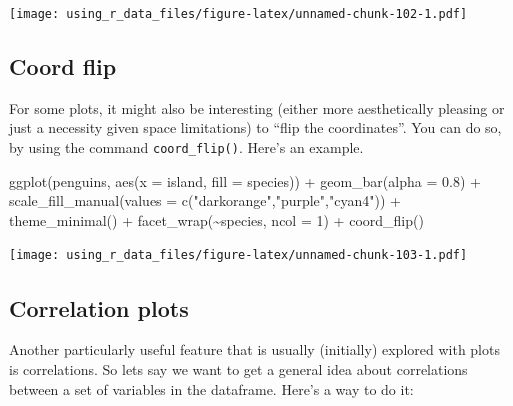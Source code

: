 \documentclass[
]{book}
\newenvironment{Shaded}{\begin{snugshade}}{\end{snugshade}}
\newcommand{\AttributeTok}[1]{\textcolor[rgb]{0.77,0.63,0.00}{#1}}
\newcommand{\DecValTok}[1]{\textcolor[rgb]{0.00,0.00,0.81}{#1}}
\newcommand{\FloatTok}[1]{\textcolor[rgb]{0.00,0.00,0.81}{#1}}
\newcommand{\FunctionTok}[1]{\textcolor[rgb]{0.00,0.00,0.00}{#1}}
\newcommand{\NormalTok}[1]{#1}
\newcommand{\SpecialCharTok}[1]{\textcolor[rgb]{0.00,0.00,0.00}{#1}}
\newcommand{\StringTok}[1]{\textcolor[rgb]{0.31,0.60,0.02}{#1}}
\begin{document}
\texttt{[image: using\_r\_data\_files/figure-latex/unnamed-chunk-102-1.pdf]}

\hypertarget{coord-flip}{%
\subsection{Coord flip}\label{coord-flip}}

For some plots, it might also be interesting (either more aesthetically pleasing or just a necessity given space limitations) to ``flip the coordinates''.
You can do so, by using the command \texttt{coord\_flip()}.
Here's an example.

\begin{Shaded}
\begin{Highlighting}[]
\FunctionTok{ggplot}\NormalTok{(penguins, }\FunctionTok{aes}\NormalTok{(}\AttributeTok{x =}\NormalTok{ island, }\AttributeTok{fill =}\NormalTok{ species)) }\SpecialCharTok{+}
  \FunctionTok{geom\_bar}\NormalTok{(}\AttributeTok{alpha =} \FloatTok{0.8}\NormalTok{) }\SpecialCharTok{+}
  \FunctionTok{scale\_fill\_manual}\NormalTok{(}\AttributeTok{values =} \FunctionTok{c}\NormalTok{(}\StringTok{"darkorange"}\NormalTok{,}\StringTok{"purple"}\NormalTok{,}\StringTok{"cyan4"}\NormalTok{)) }\SpecialCharTok{+}
  \FunctionTok{theme\_minimal}\NormalTok{() }\SpecialCharTok{+}
  \FunctionTok{facet\_wrap}\NormalTok{(}\SpecialCharTok{\textasciitilde{}}\NormalTok{species, }\AttributeTok{ncol =} \DecValTok{1}\NormalTok{) }\SpecialCharTok{+}
  \FunctionTok{coord\_flip}\NormalTok{()}
\end{Highlighting}
\end{Shaded}

\texttt{[image: using\_r\_data\_files/figure-latex/unnamed-chunk-103-1.pdf]}

\hypertarget{correlation-plots}{%
\subsection{Correlation plots}\label{correlation-plots}}

Another particularly useful feature that is usually (initially) explored with plots is correlations.
So lets say we want to get a general idea about correlations between a set of variables in the dataframe.
Here's a way to do it:
\end{document}
